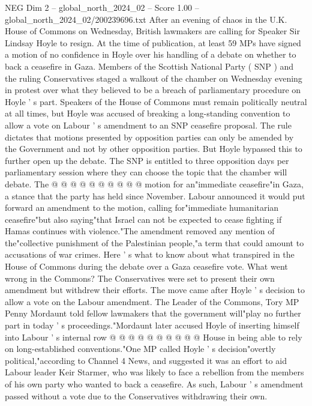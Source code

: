 \begin{textsample}{NEG Dim 2 – global\_north\_2024\_02 – Score 1.00 – global\_north\_2024\_02/200239696.txt}  \label{ex:f2_neg_307}
After an evening of chaos in the U.K.
House of Commons on Wednesday, British lawmakers are calling for Speaker Sir Lindsay Hoyle to resign.
At the time of publication, at least 59 MPs have signed a motion of no confidence in Hoyle over his handling of a debate on whether to back a ceasefire in Gaza.
Members of the Scottish National Party ( SNP ) and the ruling Conservatives staged a walkout of the chamber on Wednesday evening in protest over what they believed to be a breach of parliamentary procedure on Hoyle ' s part.
Speakers of the House of Commons must remain politically neutral at all times, but Hoyle was accused of breaking a long-standing convention to allow a vote on Labour ' s amendment to an SNP ceasefire proposal.
The rule dictates that motions presented by opposition parties can only be amended by the Government and not by other opposition parties.
But Hoyle bypassed this to further open up the debate.
The SNP is entitled to three opposition days per parliamentary session where they can choose the topic that the chamber will debate.
The @ @ @ @ @ @ @ @ @ @ motion for an"immediate ceasefire"in Gaza, a stance that the party has held since November.
Labour announced it would put forward an amendment to the motion, calling for"immediate humanitarian ceasefire"but also saying"that Israel can not be expected to cease fighting if Hamas continues with violence."The amendment removed any mention of the"collective punishment of the Palestinian people,"a term that could amount to accusations of war crimes.
Here ' s what to know about what transpired in the House of Commons during the debate over a Gaza ceasefire vote.
What went wrong in the Commons?
The Conservatives were set to present their own amendment but withdrew their efforts.
The move came after Hoyle ' s decision to allow a vote on the Labour amendment.
The Leader of the Commons, Tory MP Penny Mordaunt told fellow lawmakers that the government will"play no further part in today ' s proceedings."Mordaunt later accused Hoyle of inserting himself into Labour ' s internal row @ @ @ @ @ @ @ @ @ @ House in being able to rely on long-established conventions."One MP called Hoyle ' s decision"overtly political,"according to Channel 4 News, and suggested it was an effort to aid Labour leader Keir Starmer, who was likely to face a rebellion from the members of his own party who wanted to back a ceasefire.
As such, Labour ' s amendment passed without a vote due to the Conservatives withdrawing their own.

\end{textsample}

